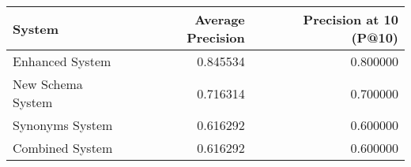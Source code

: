 \begin{tabular}{lrr}
\toprule
System & Average Precision & Precision at 10 (P@10) \\
\midrule
Enhanced System & 0.845534 & 0.800000 \\
New Schema System & 0.716314 & 0.700000 \\
Synonyms System & 0.616292 & 0.600000 \\
Combined System & 0.616292 & 0.600000 \\
\bottomrule
\end{tabular}
